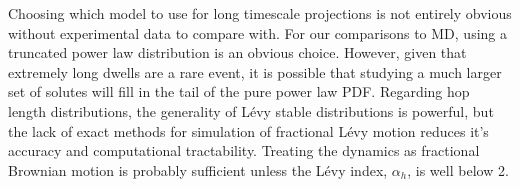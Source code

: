 \documentclass{article}
\begin{document}
  
  Choosing which model to use for long timescale projections is not entirely obvious
  without experimental data to compare with. For our comparisons to MD, using a 
  truncated power law distribution is an obvious choice. However, given that extremely
  long dwells are a rare event, it is possible that studying a much larger set of 
  solutes will fill in the tail of the pure power law PDF. Regarding hop length 
  distributions, the generality of L\'evy stable distributions is powerful, but the
  lack of exact methods for simulation of fractional L\'evy motion reduces it's 
  accuracy and computational tractability. Treating the dynamics as fractional 
  Brownian motion is probably sufficient unless the L\'evy index, $\alpha_h$, is well below 2.
  
\end{document}
